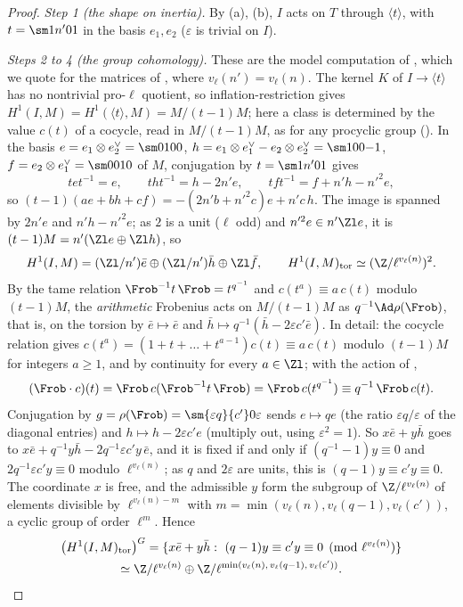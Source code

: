 \begin{proof}
\emph{Step 1 (the shape on inertia).} By (a), (b), $I$ acts on $T$ through $\langle t\rangle$, with $t=\sm1{n'}01$ in the basis $e_1,e_2$ ($\varepsilon$ is trivial on
$I$).

\emph{Steps 2 to 4 (the group cohomology).} These are the model computation of , which we quote for the matrices of
, where $v_\ell(n')=v_\ell(n)$. The kernel $K$ of $I\to\langle t\rangle$ has no nontrivial pro-$\ell$ quotient, so inflation-restriction gives
$H^1(I,M)=H^1(\langle t\rangle,M)=M/(t-1)M$; here a class is determined by the value $c(t)$ of a cocycle, read in $M/(t-1)M$, as for any procyclic group
(). In the basis $e=e_1\otimes e_2^\vee=\sm0100$, $h=e_1\otimes e_1^\vee-e_2\otimes e_2^\vee=\sm100{-1}$, $f=e_2\otimes e_1^\vee=\sm0010$ of $M$, conjugation by
$t=\sm1{n'}01$ gives
\[
tet^{-1}=e,\qquad tht^{-1}=h-2n'e,\qquad tft^{-1}=f+n'h-n'^2e,
\]
so $(t-1)(ae+bh+cf)=-(2n'b+n'^2c)e+n'c\,h$. The image is spanned by $2n'e$ and $n'h-n'^2e$; as $2$ is a unit ($\ell$ odd) and $n'^2e\in n'\Zl e$, it is
$(t-1)M=n'(\Zl e\oplus\Zl h)$, so
\[
H^1(I,M)=(\Zl/n')\bar e\oplus(\Zl/n')\bar h\oplus\Zl\bar f,\qquad H^1(I,M)_{\mathrm{tor}}\simeq(\Z/\ell^{v_\ell(n)})^2 .
\]
By the tame relation $\Frob^{-1}t\,\Frob=t^{q^{-1}}$ and $c(t^a)\equiv a\,c(t)$ modulo $(t-1)M$, the \emph{arithmetic} Frobenius acts on $M/(t-1)M$ as $q^{-1}\Ad\rho(\Frob)$,
that is, on the torsion by $\bar e\mapsto\bar e$ and $\bar h\mapsto q^{-1}(\bar h-2\varepsilon c'\bar e)$. In detail: the cocycle relation gives
$c(t^a)=(1+t+\dots+t^{a-1})c(t)\equiv a\,c(t)$ modulo $(t-1)M$ for integers $a\ge1$, and by continuity for every $a\in\Zl$; with the action of ,
\[
(\Frob\cdot c)(t)=\Frob\,c(\Frob^{-1}t\,\Frob)=\Frob\,c(t^{q^{-1}})\equiv q^{-1}\,\Frob\,c(t).
\]
Conjugation by $g=\rho(\Frob)=\sm{\varepsilon q}{c'}0\varepsilon$ sends $e\mapsto qe$ (the ratio $\varepsilon q/\varepsilon$ of the diagonal entries) and $h\mapsto h-2\varepsilon c'e$ (multiply
out, using $\varepsilon^2=1$). So $x\bar e+y\bar h$ goes to $x\bar e+q^{-1}y\bar h-2q^{-1}\varepsilon c'y\,\bar e$, and it is fixed if and only if $(q^{-1}-1)y\equiv0$ and
$2q^{-1}\varepsilon c'y\equiv0$ modulo $\ell^{v_\ell(n)}$; as $q$ and $2\varepsilon$ are units, this is $(q-1)y\equiv c'y\equiv0$. The coordinate $x$ is free, and the admissible $y$ form the
subgroup of $\Z/\ell^{v_\ell(n)}$ of elements divisible by $\ell^{v_\ell(n)-m}$ with $m=\min(v_\ell(n),v_\ell(q-1),v_\ell(c'))$, a cyclic group of order $\ell^m$. Hence
\begin{multline*}
\bigl(H^1(I,M)_{\mathrm{tor}}\bigr)^{G}=\{x\bar e+y\bar h:\ (q-1)y\equiv c'y\equiv0\pmod{\ell^{v_\ell(n)}}\}\\
\simeq\Z/\ell^{v_\ell(n)}\oplus\Z/\ell^{\min(v_\ell(n),\,v_\ell(q-1),\,v_\ell(c'))}.
\end{multline*}


\end{proof}
